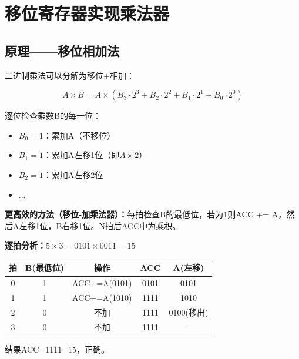 \section{移位寄存器实现乘法器}

\subsection{原理——移位相加法}

二进制乘法可以分解为移位+相加：

$$A \times B = A \times (B_3 \cdot 2^3 + B_2 \cdot 2^2 + B_1 \cdot 2^1 + B_0 \cdot 2^0)$$

逐位检查乘数B的每一位：
\begin{itemize}
  \item $B_0=1$：累加A（不移位）
  \item $B_1=1$：累加A左移1位（即$A\times2$）
  \item $B_2=1$：累加A左移2位
  \item ...
\end{itemize}

\textbf{更高效的方法（移位-加乘法器）：}每拍检查B的最低位，若为1则ACC += A，然后A左移1位，B右移1位。N拍后ACC中为乘积。

\textbf{逐拍分析：$5 \times 3 = 0101 \times 0011 = 15$}

\begin{center}
\begin{tabular}{|c|c|c|c|c|}
\hline
拍 & B(最低位) & 操作 & ACC & A(左移) \\
\hline
0 & 1 & ACC+=A(0101) & 0101 & 0101 \\
1 & 1 & ACC+=A(1010) & 1111 & 1010 \\
2 & 0 & 不加 & 1111 & 0100(移出) \\
3 & 0 & 不加 & 1111 & — \\
\hline
\end{tabular}
\end{center}

结果ACC=1111=15，正确。

